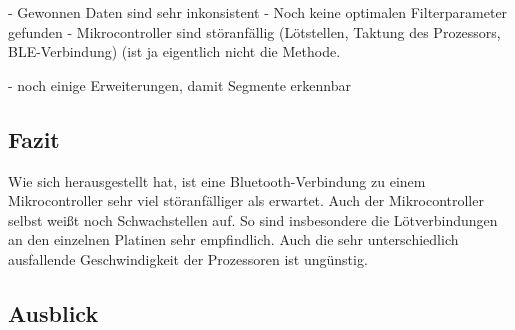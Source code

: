- Gewonnen Daten sind sehr inkonsistent
- Noch keine optimalen Filterparameter gefunden
- Mikrocontroller sind störanfällig (Lötstellen, Taktung des Prozessors, BLE-Verbindung) (ist ja eigentlich nicht die Methode.

- noch einige Erweiterungen, damit Segmente erkennbar

\subsection{Fazit}

Wie sich herausgestellt hat, ist eine Bluetooth-Verbindung zu einem Mikrocontroller sehr viel störanfälliger als erwartet. Auch der Mikrocontroller selbst weißt noch Schwachstellen auf. So sind insbesondere die Lötverbindungen an den einzelnen Platinen sehr empfindlich. Auch die sehr unterschiedlich ausfallende Geschwindigkeit der Prozessoren ist ungünstig.


\subsection{Ausblick}

